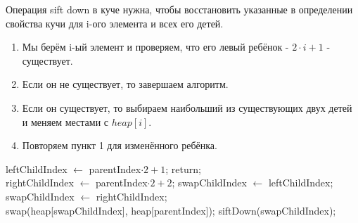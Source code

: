 \begin{operation}
    \hypertarget{sd}{}
    Операция sift down в куче нужна,
    чтобы восстановить указанные в определении свойства кучи для i-ого элемента и всех его детей.
    \begin{enumerate}
        \item Мы берём i-ый элемент и проверяем, что его левый ребёнок - $2\cdot i + 1$ - существует.
        \item Если он не существует, то завершаем алгоритм.
        \item Если он существует, то выбираем наибольший из существующих двух детей и меняем местами с $heap[i]$.
        \item Повторяем пункт 1 для изменённого ребёнка.
    \end{enumerate}

    \begin{algorithmic}[0]
        \State leftChildIndex $\gets$ parentIndex$\cdot 2 + 1$;
            \State return;
        \EndIf\\
        \State rightChildIndex $\gets$ parentIndex$\cdot 2 + 2$;
        \State swapChildIndex $\gets$ leftChildIndex;
            \State swapChildIndex $\gets$ rightChildIndex;
        \EndIf\\

            \State swap(heap[swapChildIndex], heap[parentIndex]);
            \State siftDown(swapChildIndex);
        \EndIf

        \EndFunction
    \end{algorithmic}
\end{operation}


